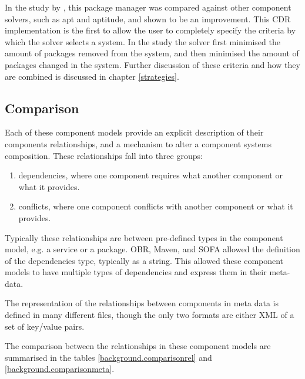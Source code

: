 In the study by \cite{abate2011}, this package manager was compared against other component solvers, such as apt and aptitude, and shown to be an improvement.
This CDR implementation is the first to allow the user to completely specify the criteria by which the solver selects a system.
In the study the solver first minimised the amount of packages removed from the system, and then minimised the amount of packages changed in the system.
Further discussion of these criteria and how they are combined is discussed in chapter \ref{strategies}. 

\subsection{Comparison}
Each of these component models provide an explicit description of their components relationships, and a mechanism to alter a component systems composition.
These relationships fall into three groups:
\begin{enumerate}
  \item dependencies, where one component requires what another component or what it provides.
  \item conflicts, where one component conflicts with another component or what it provides. 
\end{enumerate} 

Typically these relationships are between pre-defined types in the component model, e.g. a service or a package.
OBR, Maven, and SOFA allowed the definition of the dependencies type, typically as a string.
This allowed these component models to have multiple types of dependencies and express them in their meta-data. 

The representation of the relationships between components in meta data is defined in many different files, though the only two formats are either XML of a set of key/value pairs.

The comparison between the relationships in these component models are summarised in the tables  \ref{background.comparisonrel} and \ref{background.comparisonmeta}.  

